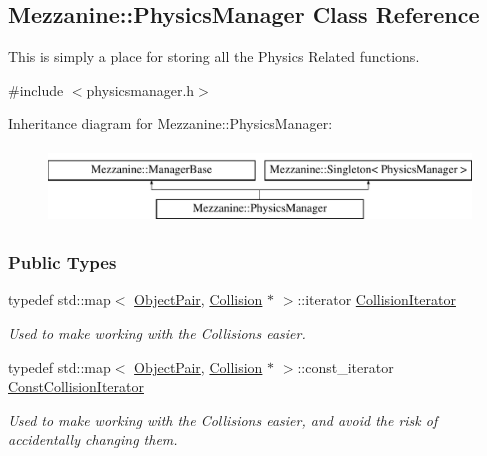 \hypertarget{classMezzanine_1_1PhysicsManager}{
\subsection{Mezzanine::PhysicsManager Class Reference}
\label{classMezzanine_1_1PhysicsManager}
}


This is simply a place for storing all the Physics Related functions.  




{\ttfamily \#include $<$physicsmanager.h$>$}

Inheritance diagram for Mezzanine::PhysicsManager:\begin{figure}[H]
\begin{center}
\leavevmode
\includegraphics[height=2.000000cm]{classMezzanine_1_1PhysicsManager}
\end{center}
\end{figure}
\subsubsection*{Public Types}
\begin{DoxyCompactItemize}
\item 
\hypertarget{classMezzanine_1_1PhysicsManager_a8d2fa60cdfdc7997a09cb8a3434371af}{
typedef std::map$<$ \hyperlink{classMezzanine_1_1ObjectPair}{ObjectPair}, \hyperlink{classMezzanine_1_1Collision}{Collision} $\ast$ $>$::iterator \hyperlink{classMezzanine_1_1PhysicsManager_a8d2fa60cdfdc7997a09cb8a3434371af}{CollisionIterator}}
\label{classMezzanine_1_1PhysicsManager_a8d2fa60cdfdc7997a09cb8a3434371af}

\begin{DoxyCompactList}\small\item\em Used to make working with the Collisions easier. \item\end{DoxyCompactList}\item 
\hypertarget{classMezzanine_1_1PhysicsManager_a667151fe9525d7f3f174ad55a499065f}{
typedef std::map$<$ \hyperlink{classMezzanine_1_1ObjectPair}{ObjectPair}, \hyperlink{classMezzanine_1_1Collision}{Collision} $\ast$ $>$::const\_\-iterator \hyperlink{classMezzanine_1_1PhysicsManager_a667151fe9525d7f3f174ad55a499065f}{ConstCollisionIterator}}
\label{classMezzanine_1_1PhysicsManager_a667151fe9525d7f3f174ad55a499065f}

\begin{DoxyCompactList}\small\item\em Used to make working with the Collisions easier, and avoid the risk of accidentally changing them. \item\end{DoxyCompactList}\end{DoxyCompactItemize}
